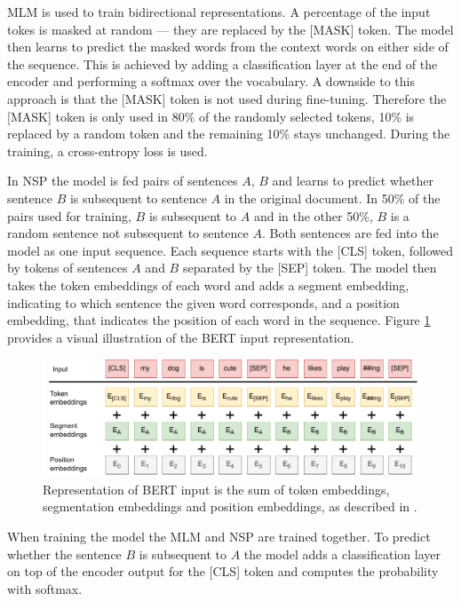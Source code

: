 MLM is used to train bidirectional representations. A percentage of the input tokes is masked at random --- they are replaced by the [MASK] token. The model then learns to predict the masked words from the context words on either side of the sequence. This is achieved by adding a classification layer at the end of the encoder and performing a softmax over the vocabulary. A downside to this approach is that the [MASK] token is not used during fine-tuning. Therefore the [MASK] token is only used in 80\% of the randomly selected tokens, 10\% is replaced by a random token and the remaining 10\% stays unchanged. During the training, a cross-entropy loss is used.

In NSP the model is fed pairs of sentences $A$, $B$ and learns to predict whether sentence $B$ is subsequent to sentence $A$ in the original document. In 50\% of the pairs used for training, $B$ is subsequent to $A$ and in the other 50\%, $B$ is a random sentence not subsequent to sentence $A$. Both sentences are fed into the model as one input sequence. Each sequence starts with the [CLS] token, followed by tokens of sentences $A$ and $B$ separated by the [SEP] token. The model then takes the token embeddings of each word and adds a segment embedding, indicating to which sentence the given word corresponds, and a position embedding, that indicates the position of each word in the sequence. Figure \ref{fig:bert1} provides a visual illustration of the BERT input representation.

\begin{figure}[H]
    \centering
    \includegraphics[scale=0.8]{obrazky-figures/bert1.pdf}
    \caption{Representation of BERT input is the sum of token embeddings, segmentation embeddings and position embeddings, as described in \cite{bert}.}
    \label{fig:bert1}
\end{figure}

When training the model the MLM and NSP are trained together. To predict whether the sentence $B$ is subsequent to $A$ the model adds a classification layer on top of the encoder output for the [CLS] token and computes the probability with softmax.

